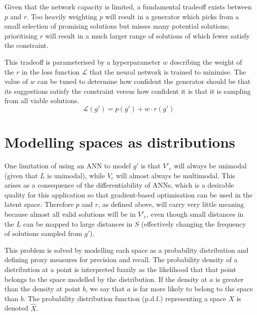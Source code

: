\documentclass[../../main.tex]{subfiles}
\begin{document}
Given that the network capacity is limited, a fundamental tradeoff exists between $p$ and $r$.
Too heavily weighting $p$ will result in a generator which picks from a small selection of promising solutions but misses many potential solutions; prioritising $r$ will result in a much larger range of solutions of which fewer satisfy the constraint.

This tradeoff is parameterised by a hyperparameter $w$ describing the weight of the $r$ in the loss function $\mathcal{L}$ that the neural network is trained to minimise.
The value of $w$ can be tuned to determine how confident the generator should be that its suggestions satisfy the constraint versus how confident it is that it is sampling from all viable solutions.
\begin{equation}
	\mathcal{L}(g')=p(g')+w\cdot r(g')
\end{equation}

\section{Modelling spaces as distributions} \label{section:modellingSpacesAsDistributions}

One limitation of using an ANN to model $g'$ is that $V'_c$ will always be unimodal (given that $L$ is unimodal), while $V_c$ will almost always be multimodal.
This arises as a consequence of the differentiability of ANNs, which is a desirable quality for this application so that gradient-based optimisation can be used in the latent space.
Therefore $p$ and $r$, as defined above, will carry very little meaning because almost all valid solutions will be in $V'_c$, even though small distances in the $L$ can be mapped to large distances in $S$ (effectively changing the frequency of solutions sampled from $g'$).

This problem is solved by modelling each space as a probability distribution and defining proxy measures for precision and recall.
The probability density of a distribution at a point is interpreted fuzzily as the likelihood that that point belongs to the space modelled by the distribution.
If the density at $a$ is greater than the density at point $b$, we say that $a$ is far more likely to belong to the space than $b$.
The probability distribution function (p.d.f.) representing a space $X$ is denoted $\hat{X}$.
\end{document}
